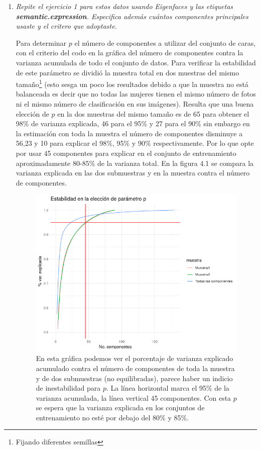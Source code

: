 \documentclass[paper=letter, fontsize=11pt]{scrartcl}
\numberwithin{equation}{section} %
\numberwithin{figure}{section} %
\numberwithin{table}{section} %
\begin{document}
\begin{enumerate}
\item \textit{Repite el ejercicio 1 para estos datos usando Eigenfaces y las etiquetas \textbf{semantic.expression}. Especifica además cuántos componentes principales usaste y el critero que adoptaste.}

Para determinar $p$ el número de componentes a utilizar del conjunto de caras, con el criterio del codo en la gráfica del número de componentes contra la varianza acumulada de todo el conjunto de datos. Para verificar la estabilidad de este parámetro se dividió la muestra total en dos muestras del mismo tamaño\footnote{Fijando diferentes semillas}  (esto sesga un poco los resultados debido a que la muestra no está balanceada es decir que no todas las mujeres tienen el mismo número de fotos ni el mismo número de clasificación en sus imágenes). Resulta que una buena elección de $p$ en la dos muestras del mismo tamaño es de 65 para obtener el 98\% de varianza explicada, 46 para el 95\% y 27 para el 90\% sin embargo en la estimación con toda la muestra el número de componentes disminuye a 56,23 y 10 para explicar el 98\%, 95\% y 90\% respectivamente. Por lo que opte por usar 45 componentes para explicar en el conjunto de entrenamiento aproximadamente 80-85\% de la varianza total. En la figura 4.1 se compara la varianza explicada en las dos submuestras y en la muestra contra el número de componentes.

\begin{figure}[H]
  \begin{center}
    \includegraphics[scale =.7]{eleccion_p_imagenes.png}
    \caption{En esta gráfica podemos ver el porcentaje de varianza explicado acumulado contra el número de componentes de toda la muestra y de dos submuestras (no equilibradas), parece haber un indicio de inestabilidad para $p$. La línea horizontal marca el 95\% de la varianza acumulada, la línea vertical 45 componentes. Con esta $p$ se espera que la varianza explicada en los conjuntos de entrenamiento no esté por debajo del 80\% y 85\%.}
    \label{figura4_1}
  \end{center}
\end{figure}


\end{enumerate}
\end{document}
